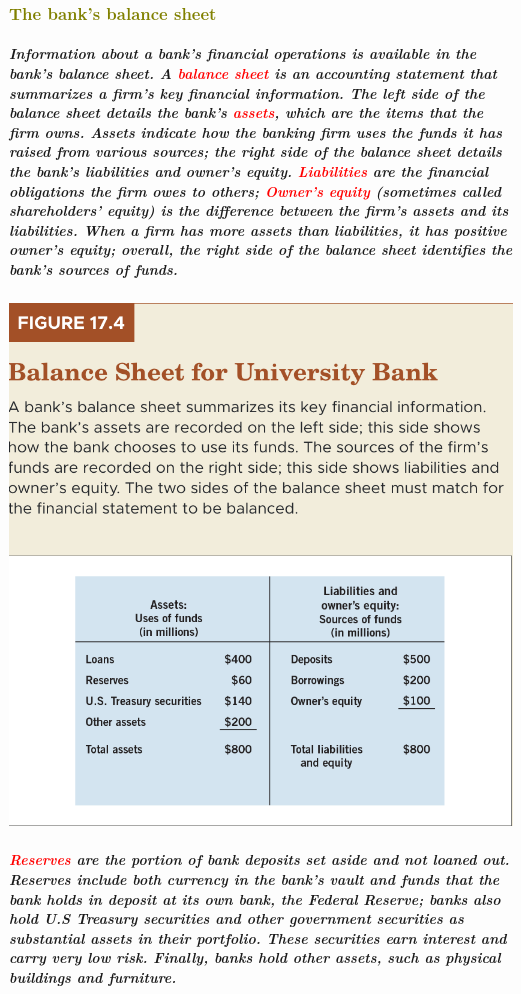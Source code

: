 \documentclass[11pt]{article} %
\begin{document}
\subsubsection*{\textcolor{olive}{The bank's balance sheet}}
\subparagraph*{Information about a bank's financial operations is available in the bank's balance sheet. A \textbf{\textcolor{red}{balance sheet}} is an accounting statement that summarizes a firm's key financial information. The left side of the balance sheet details the bank's \textbf{\textcolor{red}{assets}}, which are the items that the firm owns. Assets indicate how the banking firm uses the funds it has raised from various sources; the right side of the balance sheet details the bank's liabilities and owner's equity. \textbf{\textcolor{red}{Liabilities}} are the financial obligations the firm owes to others; \textbf{\textcolor{red}{Owner's equity}} (sometimes called \textit{\textbf{shareholders' equity}}) is the difference between the firm's assets and its liabilities. When a firm has more assets than liabilities, it has positive owner's equity; overall, the right side of the balance sheet identifies the bank's sources of funds.}
\begin{center}
\includegraphics[scale=0.5]{images/Figure 17.4.png} 
\end{center}
\subparagraph*{\textbf{\textcolor{red}{Reserves}} are the portion of bank deposits set aside and not loaned out. Reserves include both currency in the bank's vault and funds that the bank holds in deposit at its own bank, the Federal Reserve; banks also hold U.S Treasury securities and other government securities as substantial assets in their portfolio. These securities earn interest and carry very low risk. Finally, banks hold other assets, such as physical buildings and furniture.}
\end{document}
